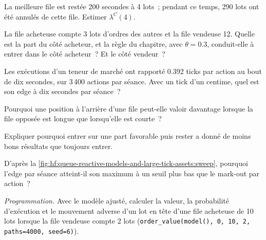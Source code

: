 \begin{exercise}[$\star$]\label{exo:hf:queue-reactive-models-and-large-tick-assets:1}
La meilleure file est restée 200 secondes à 4 lots~; pendant ce temps, 290 lots ont été annulés de cette file. Estimer $\lambda^C(4)$.
\end{exercise}

\begin{exercise}[$\star$]\label{exo:hf:queue-reactive-models-and-large-tick-assets:2}
La file acheteuse compte 3 lots d'ordres des autres et la file vendeuse 12. Quelle est la part du côté acheteur, et la règle du chapitre, avec $\theta=0.3$, conduit-elle à entrer dans le
côté acheteur~? Et le côté vendeur~?
\end{exercise}

\begin{exercise}[$\star$]\label{exo:hf:queue-reactive-models-and-large-tick-assets:3}
Les exécutions d'un teneur de marché ont rapporté 0.392 ticks par action au bout de dix secondes, sur 3\,400 actions par séance. Avec un tick d'un centime, quel est son edge à dix secondes par
séance~?
\end{exercise}

\begin{exercise}[$\star\star$]\label{exo:hf:queue-reactive-models-and-large-tick-assets:4}
Pourquoi une position à l'arrière d'une file peut-elle valoir davantage lorsque la file opposée est longue que lorsqu'elle est courte~?
\end{exercise}

\begin{exercise}[$\star\star$]\label{exo:hf:queue-reactive-models-and-large-tick-assets:5}
Expliquer pourquoi entrer sur une part favorable puis rester a donné de moins bons résultats que toujours entrer.
\end{exercise}

\begin{exercise}[$\star\star$]\label{exo:hf:queue-reactive-models-and-large-tick-assets:6}
D'après la \cref{fig:hf:queue-reactive-models-and-large-tick-assets:sweep}, pourquoi l'edge par séance atteint-il son maximum à un seuil plus bas
que le mark-out par action~?
\end{exercise}

\begin{exercise}[$\star\star\star$]\label{exo:hf:queue-reactive-models-and-large-tick-assets:7}
\emph{Programmation.} Avec le modèle ajusté, calculer la valeur, la probabilité d'exécution et le mouvement adverse d'un lot en tête d'une file acheteuse de 10 lots lorsque
la file vendeuse compte 2 lots (\texttt{order\_value(model(), 0, 10, 2, paths=4000, seed=6)}).
\end{exercise}

